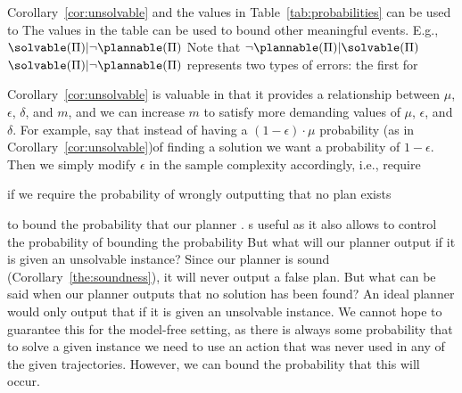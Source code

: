 Corollary~\ref{cor:unsolvable} and the values in Table~\ref{tab:probabilities} can be used to 
The values in the table can be used to bound other meaningful events. E.g., $\solvable(\Pi)|\neg\plannable(\Pi)$ 
Note that $\neg\plannable(\Pi)|\solvable(\Pi)$
$\solvable(\Pi)|\neg\plannable(\Pi)$ 
represents two types of errors: the first for 


Corollary~\ref{cor:unsolvable} is valuable in that it provides a relationship between $\mu$, $\epsilon$, $\delta$, and $m$, and we can increase $m$ to satisfy more demanding values of $\mu$, $\epsilon$, and $\delta$. For example, say
that instead of having a $(1-\epsilon)\cdot\mu$ probability (as in Corollary~\ref{cor:unsolvable})of finding a solution we want a probability of $1-\epsilon$. Then we simply modify $\epsilon$ in the sample complexity accordingly, i.e., require 






if we require the probability of wrongly outputting that no plan exists 


to bound the probability that our planner . s useful as it also allows to control the probability of bounding the probability 
But what will our planner output if it is given an unsolvable instance? Since our planner is sound (Corollary~\ref{the:soundness}), it will never output a false plan. But what can be said when our planner outputs that no solution has been found?
An ideal planner would only output that if it is given an unsolvable instance. We cannot hope to guarantee this for the model-free setting, as there is always some probability that to solve a given instance we need to use an action that was never used in any of the given trajectories. However, we can bound the probability that this will occur. 


